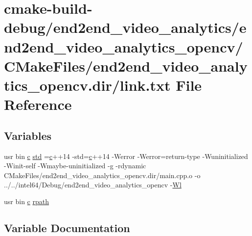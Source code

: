 \hypertarget{end2end__video__analytics_2end2end__video__analytics__opencv_2CMakeFiles_2end2end__video__analytics__opencv_8dir_2link_8txt}{}\section{cmake-\/build-\/debug/end2end\+\_\+video\+\_\+analytics/end2end\+\_\+video\+\_\+analytics\+\_\+opencv/\+C\+Make\+Files/end2end\+\_\+video\+\_\+analytics\+\_\+opencv.dir/link.txt File Reference}
\label{end2end__video__analytics_2end2end__video__analytics__opencv_2CMakeFiles_2end2end__video__analytics__opencv_8dir_2link_8txt}
\subsection*{Variables}
\begin{DoxyCompactItemize}
\item 
usr bin \hyperlink{CMakeCache_8txt_aac1d6a1710812201527c735f7c6afbaa}{c} \hyperlink{end2end__video__analytics_2end2end__video__analytics__opencv_2CMakeFiles_2end2end__video__analytics__opencv_8dir_2link_8txt_a1ccfea5f558575a112db71eeb271fabf}{std} =\hyperlink{CMakeCache_8txt_aac1d6a1710812201527c735f7c6afbaa}{c}++14 -\/std=\hyperlink{CMakeCache_8txt_aac1d6a1710812201527c735f7c6afbaa}{c}++14 -\/Werror -\/Werror=return-\/type -\/Wuninitialized -\/Winit-\/self -\/Wmaybe-\/uninitialized -\/g -\/rdynamic C\+Make\+Files/end2end\+\_\+video\+\_\+analytics\+\_\+opencv.\+dir/main.\+cpp.\+o -\/o ../../intel64/Debug/end2end\+\_\+video\+\_\+analytics\+\_\+opencv -\/\hyperlink{thirdparty_2extension_2CMakeFiles_2cpu__extension_8dir_2link_8txt_af9ccbf658ed2deb89d0d79f211e5b033}{Wl}
\item 
usr bin \hyperlink{CMakeCache_8txt_aac1d6a1710812201527c735f7c6afbaa}{c} \hyperlink{end2end__video__analytics_2end2end__video__analytics__opencv_2CMakeFiles_2end2end__video__analytics__opencv_8dir_2link_8txt_ab9d7fd7120fafa2118a4e08c1df697c7}{rpath}
\end{DoxyCompactItemize}


\subsection{Variable Documentation}

